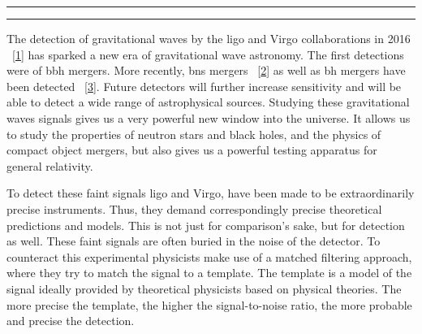 \documentclass[
  10pt,
  a4paper,
  DIV=11,
  numbers=noendperiod,
  oneside]{scrreprt}
\DeclareRobustCommand{\[}{\begin{equation}}
\DeclareRobustCommand{\]}{\end{equation}}
\begin{document}
\begin{center}\rule{0.5\linewidth}{0.5pt}\end{center}

\begin{center}\rule{0.5\linewidth}{0.5pt}\end{center}

The detection of gravitational waves by the \gls{ligo} and Virgo
collaborations in 2016
~{[}\protect\hyperlink{ref-LIGOScientific:2016aoc}{1}{]} has sparked a
new era of gravitational wave astronomy. The first detections were of
\gls{bbh} mergers. More recently, \gls{bns} mergers
~{[}\protect\hyperlink{ref-LIGOScientific:2017vwq}{2}{]} as well as
\gls{bh} mergers have been detected
~{[}\protect\hyperlink{ref-LIGOScientific:2021qlt}{3}{]}. Future
detectors will further increase sensitivity and will be able to detect a
wide range of astrophysical sources. Studying these gravitational waves
signals gives us a very powerful new window into the universe. It allows
us to study the properties of neutron stars and black holes, and the
physics of compact object mergers, but also gives us a powerful testing
apparatus for general relativity.

To detect these faint signals \gls{ligo} and Virgo, have been made to be
extraordinarily precise instruments. Thus, they demand correspondingly
precise theoretical predictions and models. This is not just for
comparison's sake, but for detection as well. These faint signals are
often buried in the noise of the detector. To counteract this
experimental physicists make use of a matched filtering approach, where
they try to match the signal to a template. The template is a model of
the signal ideally provided by theoretical physicists based on physical
theories. The more precise the template, the higher the signal-to-noise
ratio, the more probable and precise the detection.
\end{document}
